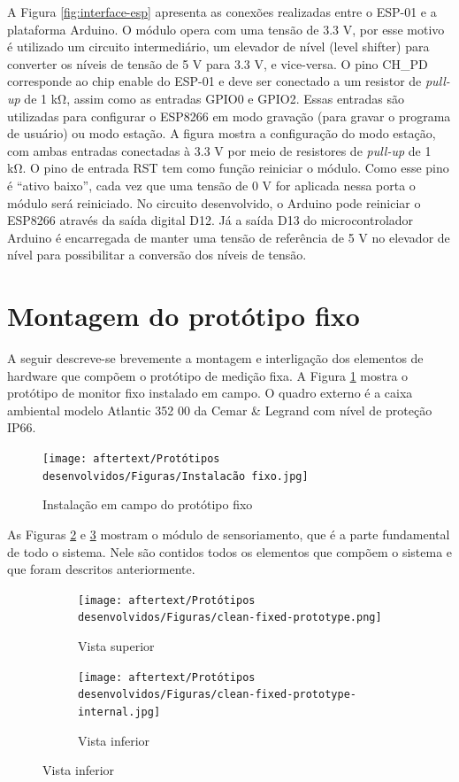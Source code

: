 A Figura \ref{fig:interface-esp} apresenta as conexões realizadas entre o ESP-01 e a plataforma Arduino. O módulo opera com uma tensão de 3.3 V, por esse motivo é utilizado um circuito intermediário, um elevador de nível (level shifter) para converter os níveis de tensão de 5 V para 3.3 V, e vice-versa. O pino CH\_PD corresponde ao chip enable do ESP-01 e deve ser conectado a um resistor de \textit{pull-up} de 1 kΩ, assim como as entradas GPIO0 e GPIO2. Essas entradas são utilizadas para configurar o ESP8266 em modo gravação (para gravar o programa de usuário) ou modo estação. A figura mostra a configuração do modo estação, com ambas entradas conectadas à 3.3 V por meio de resistores de \textit{pull-up} de 1 kΩ. O pino de entrada RST tem como função reiniciar o módulo. Como esse pino é “ativo baixo”, cada vez que uma tensão de 0 V for aplicada nessa porta o módulo será reiniciado. No circuito desenvolvido, o Arduino pode reiniciar o ESP8266 através da saída digital D12. Já a saída D13 do microcontrolador Arduino é encarregada de manter uma tensão de referência de 5 V no elevador de nível para possibilitar a conversão dos níveis de tensão.

\section{Montagem do protótipo fixo}

A seguir descreve-se brevemente a montagem e interligação dos elementos de hardware que compõem o protótipo de medição fixa. A Figura \ref{fig:fixed-prototype-field-inst} mostra o protótipo de monitor fixo instalado em campo. O quadro externo é a caixa ambiental modelo Atlantic 352 00 da Cemar \& Legrand com nível de proteção IP66.

\begin{figure}[h]
    \centering
    \caption{Instalação em campo do protótipo fixo}
    \texttt{[image: aftertext/Protótipos desenvolvidos/Figuras/Instalacão fixo.jpg]}
    \label{fig:fixed-prototype-field-inst}
\end{figure}

As Figuras \ref{fig:fixed-prototype} e \ref{fig:fixed-prototype-int} mostram o módulo de sensoriamento, que é a parte fundamental de todo o sistema. Nele são contidos todos os elementos que compõem o sistema e que foram descritos anteriormente.

\begin{figure}[h]
    \centering
    \caption{Vista interior do protótipo fixo}
    \begin{subfigure}{0.495\textwidth}
        \centering
        \texttt{[image: aftertext/Protótipos desenvolvidos/Figuras/clean-fixed-prototype.png]}
        \caption{Vista superior}
        \label{fig:fixed-prototype}
    \end{subfigure}
    \hfill
    \begin{subfigure}{0.495\textwidth}
        \centering
        \texttt{[image: aftertext/Protótipos desenvolvidos/Figuras/clean-fixed-prototype-internal.jpg]}
        \caption{Vista inferior}
        \label{fig:fixed-prototype-int}
    \end{subfigure}
    \label{fig:sensors}
\end{figure}

